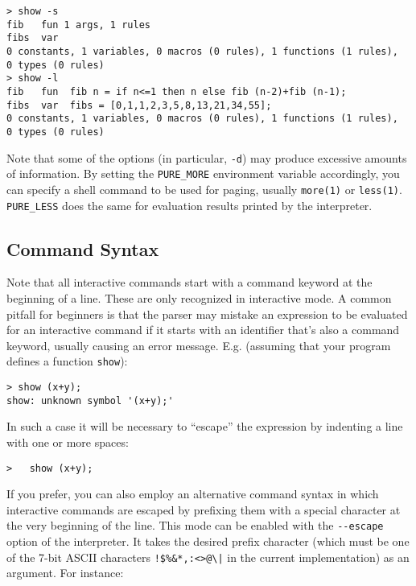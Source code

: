 \documentclass[a4paper,12pt]{article}
\begin{document}
\begin{lstlisting}
> show -s
fib   fun 1 args, 1 rules
fibs  var
0 constants, 1 variables, 0 macros (0 rules), 1 functions (1 rules),
0 types (0 rules)
> show -l
fib   fun  fib n = if n<=1 then n else fib (n-2)+fib (n-1);
fibs  var  fibs = [0,1,1,2,3,5,8,13,21,34,55];
0 constants, 1 variables, 0 macros (0 rules), 1 functions (1 rules),
0 types (0 rules)
\end{lstlisting}

Note that some of the options (in particular, \verb|-d|) may produce excessive amounts of information. By setting the \texttt{PURE\_MORE} environment variable accordingly, you can specify a shell command to be used for paging, usually \texttt{more(1)} or \texttt{less(1)}. \texttt{PURE\_LESS} does the same for evaluation results printed by the interpreter.

\subsection{Command Syntax}
\label{Syntax}

Note that all interactive commands start with a command keyword at the beginning of a line. These are only recognized in interactive mode. A common pitfall for beginners is that the parser may mistake an expression to be evaluated for an interactive command if it starts with an identifier that's also a command keyword, usually causing an error message. E.g. (assuming that your program defines a function \verb:show:):

\begin{lstlisting}
> show (x+y);
show: unknown symbol '(x+y);'
\end{lstlisting}

In such a case it will be necessary to ``escape'' the expression by indenting a line with one or more spaces:

\begin{lstlisting}
>   show (x+y);
\end{lstlisting}

If you prefer, you can also employ an alternative command syntax in which interactive commands are escaped by prefixing them with a special character at the very beginning of the line. This mode can be enabled with the \verb:--escape: option of the interpreter. It takes the desired prefix character (which must be one of the 7-bit ASCII characters \verb?!$%&*,:<>@\|? in the current implementation) as an argument. For instance:
\end{document}
